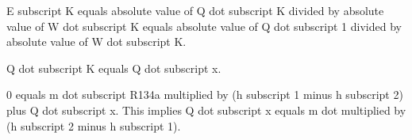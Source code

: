 E subscript K equals absolute value of Q dot subscript K divided by absolute value of W dot subscript K equals absolute value of Q dot subscript 1 divided by absolute value of W dot subscript K.  

Q dot subscript K equals Q dot subscript x.  

0 equals m dot subscript R134a multiplied by (h subscript 1 minus h subscript 2) plus Q dot subscript x. This implies Q dot subscript x equals m dot multiplied by (h subscript 2 minus h subscript 1).